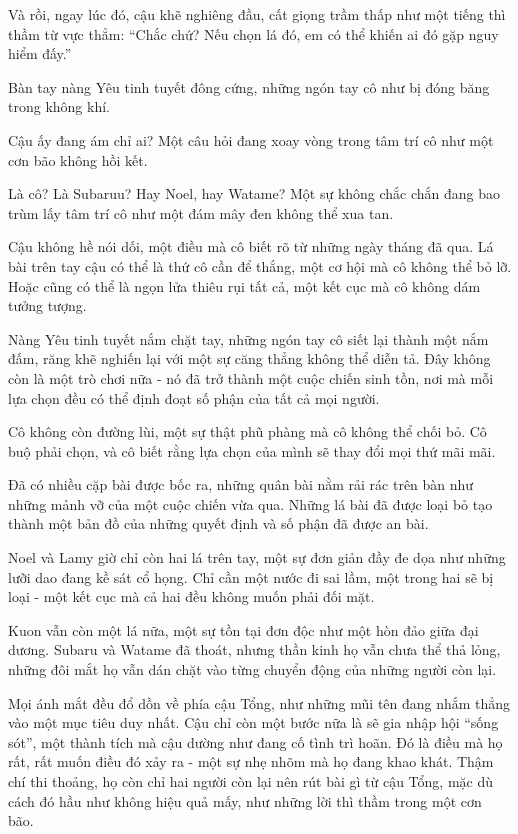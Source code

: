 \documentclass[../main.tex]{subfiles}
\begin{document}
Và rồi, ngay lúc đó, cậu khẽ nghiêng đầu, cất giọng trầm thấp như một tiếng thì thầm từ vực thẳm: ``Chắc chứ? Nếu chọn lá đó, em có thể khiến ai đó gặp nguy hiểm đấy.''

Bàn tay nàng Yêu tinh tuyết đông cứng, những ngón tay cô như bị đóng băng trong không khí.

Cậu ấy đang ám chỉ ai? Một câu hỏi đang xoay vòng trong tâm trí cô như một cơn bão không hồi kết.

Là cô? Là Subaruu? Hay Noel, hay Watame? Một sự không chắc chắn đang bao trùm lấy tâm trí cô như một đám mây đen không thể xua tan.

Cậu không hề nói dối, một điều mà cô biết rõ từ những ngày tháng đã qua. Lá bài trên tay cậu có thể là thứ cô cần để thắng, một cơ hội mà cô không thể bỏ lỡ. Hoặc cũng có thể là ngọn lửa thiêu rụi tất cả, một kết cục mà cô không dám tưởng tượng.

Nàng Yêu tinh tuyết nắm chặt tay, những ngón tay cô siết lại thành một nắm đấm, răng khẽ nghiến lại với một sự căng thẳng không thể diễn tả. Đây không còn là một trò chơi nữa - nó đã trở thành một cuộc chiến sinh tồn, nơi mà mỗi lựa chọn đều có thể định đoạt số phận của tất cả mọi người.

Cô không còn đường lùi, một sự thật phũ phàng mà cô không thể chối bỏ. Cô buộ phải chọn, và cô biết rằng lựa chọn của mình sẽ thay đổi mọi thứ mãi mãi.

\il

Đã có nhiều cặp bài được bốc ra, những quân bài nằm rải rác trên bàn như những mảnh vỡ của một cuộc chiến vừa qua. Những lá bài đã được loại bỏ tạo thành một bản đồ của những quyết định và số phận đã được an bài.

Noel và Lamy giờ chỉ còn hai lá trên tay, một sự đơn giản đầy đe dọa như những lưỡi dao đang kề sát cổ họng. Chỉ cần một nước đi sai lầm, một trong hai sẽ bị loại - một kết cục mà cả hai đều không muốn phải đối mặt.

Kuon vẫn còn một lá nữa, một sự tồn tại đơn độc như một hòn đảo giữa đại dương.  Subaru và Watame đã thoát, nhưng thần kinh họ vẫn chưa thể thả lỏng, những đôi mắt họ vẫn dán chặt vào từng chuyển động của những người còn lại.

Mọi ánh mắt đều đổ dồn về phía cậu Tổng, như những mũi tên đang nhắm thẳng vào một mục tiêu duy nhất. Cậu chỉ còn một bước nữa là sẽ gia nhập hội ``sống sót'', một thành tích mà cậu dường như đang cố tình trì hoãn. Đó là điều mà họ rất, rất muốn điều đó xảy ra - một sự nhẹ nhõm mà họ đang khao khát. Thậm chí thi thoảng, họ còn chỉ hai người còn lại nên rút bài gì từ cậu Tổng, mặc dù cách đó hầu như không hiệu quả mấy, như những lời thì thầm trong một cơn bão.
\end{document}
